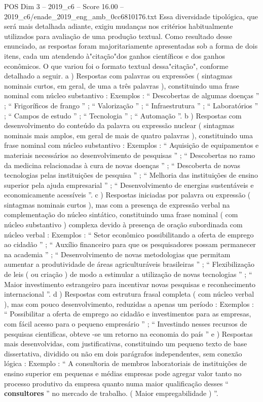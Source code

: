 \begin{textsample}{POS Dim 3 – 2019\_c6 – Score 16.00 – 2019\_c6/enade\_2019\_eng\_amb\_0cc6810176.txt}
Essa diversidade tipológica, que será mais detalhada adiante, exigiu mudanças nos critérios habitualmente utilizados para avaliação de uma produção textual.
Como resultado desse enunciado, as respostas foram majoritariamente apresentadas sob a forma de dois itens, cada um atendendo à"citação"dos ganhos científicos e dos ganhos econômicos.
O que variou foi o formato textual dessa"citação", conforme detalhado a seguir. a ) Respostas com palavras ou expressões ( sintagmas nominais curtos, em geral, de uma a três palavras ), constituindo uma frase nominal com núcleo substantivo : Exemplos : “ Descobertas de algumas doenças ” ; “ Frigoríficos de frango ” ; “ Valorização ” ; “ Infraestrutura ” ; “ Laboratórios ” ; “ Campos de estudo ” ; “ Tecnologia ” ; “ Automação ”. b ) Respostas com desenvolvimento do conteúdo da palavra ou expressão nuclear ( sintagmas nominais mais amplos, em geral de mais de quatro palavras ), constituindo uma frase nominal com núcleo substantivo : Exemplos : “ Aquisição de equipamentos e materiais necessários ao desenvolvimento de pesquisas ” ; “ Descobertas no ramo da medicina relacionadas à cura de novas doenças ” ; “ Descoberta de novas tecnologias pelas instituições de pesquisa ” ; “ Melhoria das instituições de ensino superior pela ajuda empresarial ” ; “ Desenvolvimento de energias sustentáveis e economicamente acessíveis ”. c ) Respostas iniciadas por palavra ou expressão ( sintagmas nominais curtos ), mas com a presença de expressão verbal na complementação do núcleo sintático, constituindo uma frase nominal ( com núcleo substantivo ) complexa devido à presença de oração subordinada com núcleo verbal : Exemplos : “ Setor econômico possibilitando a oferta de emprego ao cidadão ” ; “ Auxílio financeiro para que os pesquisadores possam permanecer na academia ” ; “ Desenvolvimento de novas metodologias que permitam aumentar a produtividade de áreas agriculturáveis brasileiras ” ; “ Flexibilização de leis ( ou criação ) de modo a estimular a utilização de novas tecnologias ” ; “ Maior investimento estrangeiro para incentivar novas pesquisas e reconhecimento internacional ”. d ) Respostas com estrutura frasal completa ( com núcleo verbal ), mas com pouco desenvolvimento, reduzidas a apenas um período : Exemplos : “ Possibilitar a oferta de emprego ao cidadão e investimentos para as empresas, com fácil acesso para o pequeno empresário ” ; “ Investindo nesses recursos de pesquisas cientificas, obteve -se um retorno na economia do país ” e ) Respostas mais desenvolvidas, com justificativas, constituindo um pequeno texto de base dissertativa, dividido ou não em dois parágrafos independentes, sem conexão lógica : Exemplo : “ A consultoria de membros laboratoriais de instituições de ensino superior em pequenas e médias empresas pode agregar valor tanto no processo produtivo da empresa quanto numa maior qualificação desses “ \textbf{consultores} ” no mercado de trabalho. ( Maior empregabilidade ) ”.

\end{textsample}
